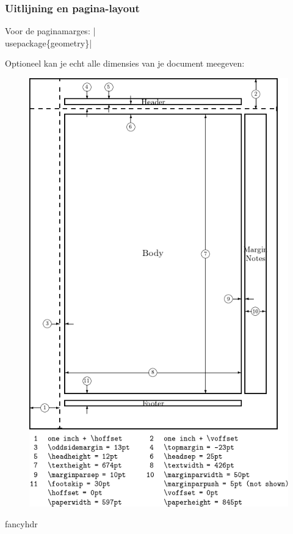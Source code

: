 \documentclass{cursuspresentatie}
\begin{document}
\begin{frame}
	\frametitle{Uitlijning en pagina-layout}
	Voor de paginamarges: \hll|\\usepackage\{geometry\}|

	Optioneel kan je echt alle dimensies van je document meegeven:
	\begin{figure}
			\includegraphics[height=0.9\textheight]{assets/Layout-dimensions.png}
	\end{figure}
\end{frame}

\begin{saveblock}{fancyhdr}
    \begin{highlightblock}
        \usepackage{fancyhdr}
        \pagestyle{fancy}
        \fancyhf{}
    \end{highlightblock}
\end{saveblock}
\end{document}
